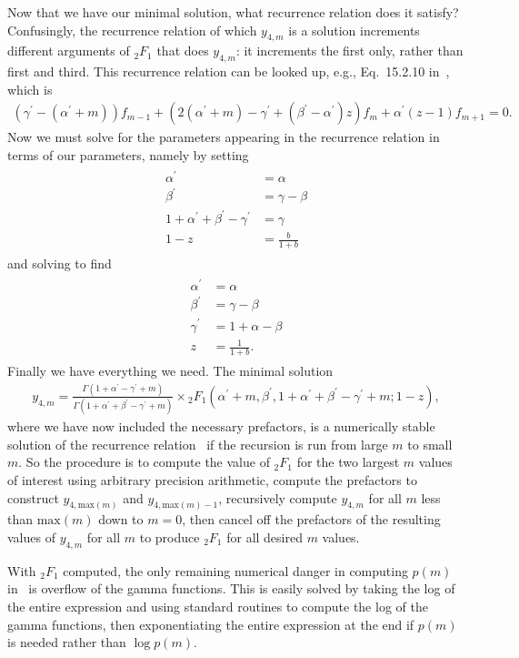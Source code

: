 Now that we have our minimal solution,
what recurrence relation does it satisfy?
Confusingly, the recurrence relation of which $y_{4,m}$ is a solution
increments different arguments of ${_2F_1}$ that does $y_{4,m}$:
it increments the first only, rather than first and third.
This recurrence relation can be looked up, e.g., Eq.~15.2.10
in~\cite{Abramowitz1964}, which is
\begin{align}
(\gamma^\prime - (\alpha^\prime + m)) f_{m-1}
+
(2(\alpha^\prime+m) - \gamma^\prime + (\beta^\prime - \alpha^\prime)z)f_m
+ \alpha^\prime(z-1) f_{m+1} = 0.
\label{eq:chosen_rec_rel}
\end{align}
Now we must solve for the parameters appearing in the recurrence relation
in terms of our parameters, namely by setting
\begin{align}
\begin{split}
\alpha^\prime &= \alpha
\\
\beta^\prime &= \gamma - \beta
\\
1 + \alpha^\prime + \beta^\prime - \gamma^\prime &= \gamma
\\
1 - z &= \frac{b}{1+b}
\end{split}
\end{align}
and solving to find
\begin{align}
\begin{split}
\alpha^\prime &= \alpha
\\
\beta^\prime &= \gamma - \beta
\\
\gamma^\prime &= 1 + \alpha - \beta
\\
z &= \frac{1}{1+b}
.
\end{split}
\end{align}
Finally we have everything we need. The minimal solution
\begin{align}
y_{4,m}
=
\frac{\Gamma(1+\alpha^\prime-\gamma^\prime+m)}
        {\Gamma(1+\alpha^\prime+\beta^\prime-\gamma^\prime+m)}
\times
{_2F_1}\left(\alpha^\prime + m,
                \beta^\prime,
                1+\alpha^\prime+\beta^\prime-\gamma^\prime+m;
                1-z\right),
\end{align}
where we have now included the necessary prefactors,
is a numerically stable solution of the recurrence
relation~ if the recursion is run
from large $m$ to small $m$.
So the procedure is to compute the value of ${_2F_1}$ for the two
largest $m$ values of interest using arbitrary precision arithmetic,
compute the prefactors to construct
$y_{4,\text{max}(m)}$ and $y_{4,\text{max}(m)-1}$,
recursively compute $y_{4,m}$ for all $m$ less than $\text{max}(m)$ down
to $m=0$, then cancel off the prefactors of the resulting values of
$y_{4,m}$ for all $m$ to produce ${_2F_1}$ for all desired $m$ values.

With ${_2F_1}$ computed, the only remaining numerical danger in computing
$p(m)$ in~ is overflow of the gamma functions.
This is easily solved by taking the log of the entire expression
and using standard routines to compute the log of the gamma functions,
then exponentiating the entire expression at the end if $p(m)$
is needed rather than $\log p(m)$.